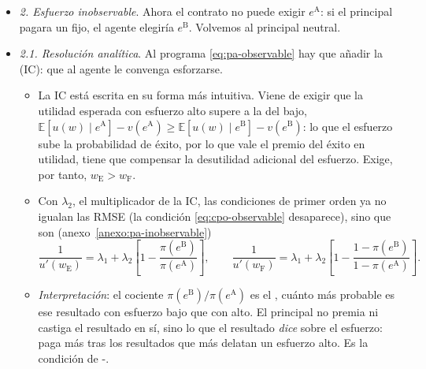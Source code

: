 \documentclass[11pt]{article}
\begin{document}
\begin{itemize}
\item \emph{2. Esfuerzo inobservable}. Ahora el contrato no puede exigir $e^{\mathrm{A}}$: si el principal pagara un fijo, el agente elegiría $e^{\mathrm{B}}$. Volvemos al principal neutral.
\item \emph{2.1. Resolución analítica}. Al programa \eqref{eq:pa-observable} hay que añadir la  (IC): que al agente le convenga esforzarse.
  \begin{itemize}
  \item La IC está escrita en su forma más intuitiva. Viene de exigir que la utilidad esperada con esfuerzo alto supere a la del bajo, $\mathbb{E}[u(w)\mid e^{\mathrm{A}}]-v(e^{\mathrm{A}})\geq\mathbb{E}[u(w)\mid e^{\mathrm{B}}]-v(e^{\mathrm{B}})$: lo que el esfuerzo sube la probabilidad de éxito, por lo que vale el premio del éxito en utilidad, tiene que compensar la desutilidad adicional del esfuerzo. Exige, por tanto, $w_{\mathrm{E}}>w_{\mathrm{F}}$.
  \item Con $\lambda_2$, el multiplicador de la IC, las condiciones de primer orden ya no igualan las RMSE (la condición \eqref{eq:cpo-observable} desaparece), sino que son (anexo~\ref{anexo:pa-inobservable})
  \begin{equation}
  \frac{1}{u'(w_{\mathrm{E}})}=\lambda_1+\lambda_2\left[1-\frac{\pi(e^{\mathrm{B}})}{\pi(e^{\mathrm{A}})}\right],\qquad
  \frac{1}{u'(w_{\mathrm{F}})}=\lambda_1+\lambda_2\left[1-\frac{1-\pi(e^{\mathrm{B}})}{1-\pi(e^{\mathrm{A}})}\right]. \label{eq:holmstrom-mirrlees}
  \end{equation}
  \item \emph{Interpretación}: el cociente $\pi(e^{\mathrm{B}})/\pi(e^{\mathrm{A}})$ es el , cuánto más probable es ese resultado con esfuerzo bajo que con alto. El principal no premia ni castiga el resultado en sí, sino lo que el resultado \emph{dice} sobre el esfuerzo: paga más tras los resultados que más delatan un esfuerzo alto. Es la condición de -\nocite{Mirrlees1974Notes,Holmstrom1979Moral}.

\end{itemize}
\end{itemize}
\end{document}
